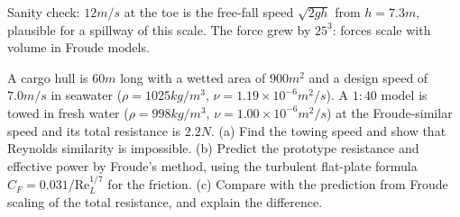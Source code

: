 Sanity check: $12\unit{m/s}$ at the toe is the free-fall speed $\sqrt{2gh}$ from $h = 7.3\unit{m}$, plausible for a spillway of this scale. The force grew by $25^3$: forces scale with volume in Froude models.

\begin{example}
A cargo hull is $60\unit{m}$ long with a wetted area of $900\unit{m^2}$ and a design speed of $7.0\unit{m/s}$ in seawater ($\rho = 1025\unit{kg/m^3}$, $\nu = 1.19\times10^{-6}\unit{m^2/s}$). A $1{:}40$ model is towed in fresh water ($\rho = 998\unit{kg/m^3}$, $\nu = 1.00\times10^{-6}\unit{m^2/s}$) at the Froude-similar speed and its total resistance is $2.2\unit{N}$.
(a) Find the towing speed and show that Reynolds similarity is impossible.
(b) Predict the prototype resistance and effective power by Froude's method, using the turbulent flat-plate formula $C_F = 0.031/\mathrm{Re}_L^{1/7}$ for the friction.
(c) Compare with the prediction from Froude scaling of the total resistance, and explain the difference.
\end{example}

